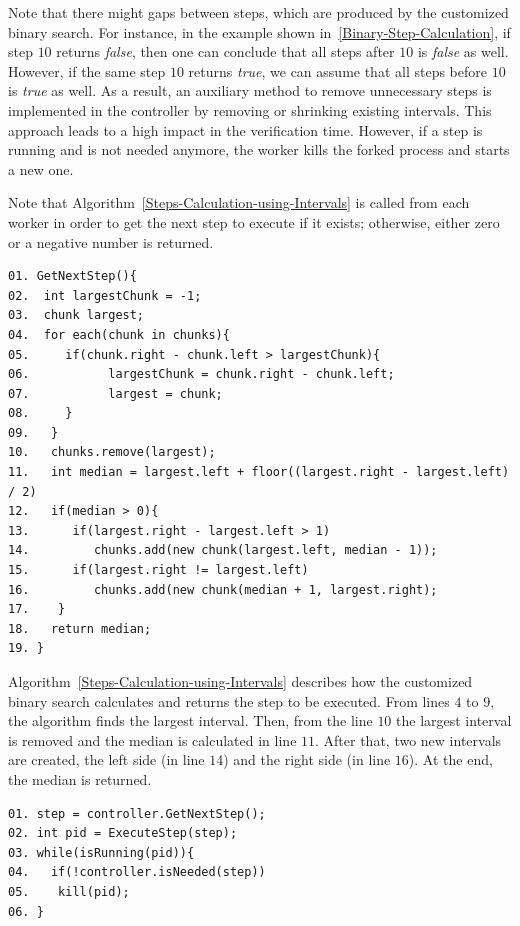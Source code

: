 Note that there might gaps between steps, which are produced by the customized binary search. For instance, in the example shown in~\ref{Binary-Step-Calculation}, if step $10$ returns \textit{false}, then one can conclude that all steps after $10$ is \textit{false} as well. However, if the same step $10$ returns \textit{true}, we can assume that all steps before $10$ is \textit{true} as well. As a result, an auxiliary method to remove unnecessary steps is implemented in the controller by removing or shrinking existing intervals. This approach leads to a high impact in the verification time. However, if a step is running and is not needed anymore, the worker kills the forked process and starts a new one.

Note that Algorithm~\ref{Steps-Calculation-using-Intervals} is called from each worker in order to get the next step to execute if it exists; otherwise, either zero or a negative number is returned.

\begin{lstlisting}[caption=Steps Calculation using Intervals,label=Steps-Calculation-using-Intervals]
01. GetNextStep(){
02.  int largestChunk = -1;
03.  chunk largest;
04.  for each(chunk in chunks){
05.     if(chunk.right - chunk.left > largestChunk){
06.           largestChunk = chunk.right - chunk.left;
07.           largest = chunk;
08.     }
09.   }	
10.   chunks.remove(largest);	
11.   int median = largest.left + floor((largest.right - largest.left) / 2)
12.   if(median > 0){
13.      if(largest.right - largest.left > 1)
14.         chunks.add(new chunk(largest.left, median - 1));	
15.      if(largest.right != largest.left)
16.         chunks.add(new chunk(median + 1, largest.right);
17.    }
18.   return median;
19. }
\end{lstlisting}

Algorithm~\ref{Steps-Calculation-using-Intervals} describes how the customized binary search calculates and returns the step to be executed. From lines $4$ to $9$, the algorithm finds the largest interval. Then, from the line $10$ the largest interval is removed and the median is calculated in line $11$. After that, two new intervals are created, the left side (in line $14$) and the right side (in line $16$). At the end, the median is returned.

\begin{lstlisting}[caption=Worker sample,label=worker-sample]
01. step = controller.GetNextStep();
02. int pid = ExecuteStep(step);
03. while(isRunning(pid)){
04.   if(!controller.isNeeded(step))
05.    kill(pid);
06. }     
\end{lstlisting}


